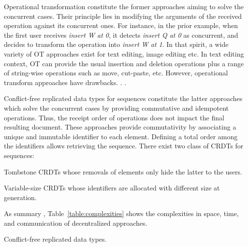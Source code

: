 \begin{asparadesc}
\item [Operational transformation] constitute the former approaches aiming to
  solve the concurrent cases. Their principle lies in modifying the arguments of
  the received operation against its concurrent ones. For instance, in the prior
  example, when the first user receives \emph{insert W at 0}, it detects
  \emph{insert Q at 0} as concurrent, and decides to transform the operation
  into \emph{insert W at 1}.  In that spirit, a wide variety of OT approaches
  exist for text editing, image editing etc. In text editing context, OT can
  provide the usual insertion and deletion operations plus a range of
  string-wise operations such as move, cut-paste, etc. However, operational
  transform approaches have drawbacks. . .
\item [Conflict-free replicated data types] for sequences constitute the latter
  approaches which solve the concurrent cases by providing commutative and
  idempotent operations. Thus, the receipt order of operations does not impact
  the final resulting document. These approaches provide commutativity by
  associating a unique and immutable identifier to each element. Defining a
  total order among the identifiers allows retrieving the sequence. There exist
  two class of CRDTs for sequences:
  \begin{inparaenum}[(i)]
  \item [Tombstone CRDTs] whose removals of elements only hide the latter to the
    users. 
  \item [Variable-size CRDTs] whose identifiers are allocated with different
    size at generation.
  \end{inparaenum}
\item [As summary], Table~\ref{table:complexities} shows the complexities in
  space, time, and communication of decentralized approaches. 
\end{asparadesc}

\begin{algorithm}
  
  \caption{\label{algo:crdtabsract}Conflict-free replicated data types.}
\end{algorithm}


